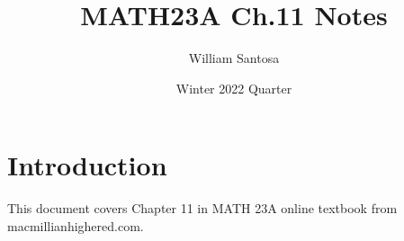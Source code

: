 \documentclass[12pt, letterpaper]{article}
\title{MATH23A Ch.11 Notes}
\author{William Santosa}
\date{Winter 2022 Quarter}
\begin{document}
\maketitle

\section{Introduction}
This document covers Chapter 11 in MATH 23A online textbook from macmillianhighered.com.
\end{document}
